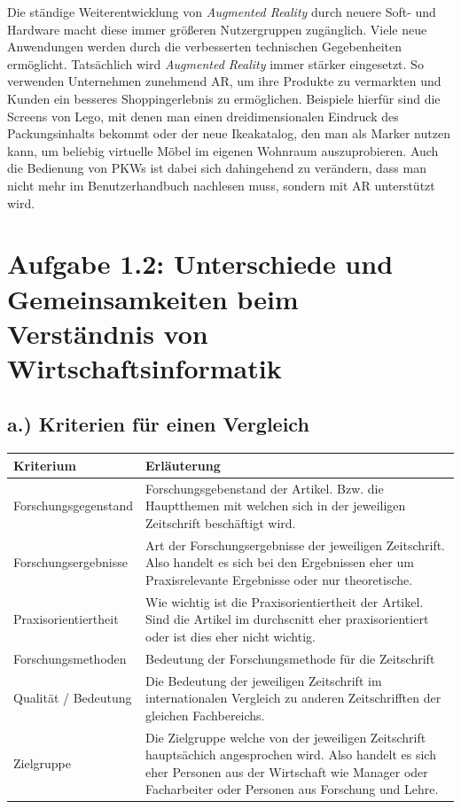 \documentclass[12pt,utf8]{scrartcl}
\begin{document}
\begin{flushleft}
Die ständige Weiterentwicklung von \textit{Augmented Reality} durch neuere Soft- und Hardware macht diese immer größeren Nutzergruppen zugänglich. Viele neue Anwendungen werden durch die verbesserten technischen Gegebenheiten ermöglicht. Tatsächlich wird \textit{Augmented Reality} immer stärker eingesetzt. So verwenden Unternehmen zunehmend AR, um ihre Produkte zu vermarkten und Kunden ein besseres Shoppingerlebnis zu ermöglichen. Beispiele hierfür sind die Screens von Lego, mit denen man einen dreidimensionalen Eindruck des Packungsinhalts bekommt oder der neue Ikeakatalog, den man als Marker nutzen kann, um beliebig virtuelle Möbel im eigenen Wohnraum auszuprobieren. Auch die Bedienung von PKWs ist dabei sich dahingehend zu verändern, dass man nicht mehr im Benutzerhandbuch nachlesen muss, sondern mit AR unterstützt wird.
\linebreak
\linebreak

\section*{\label{sec:einfuehrung}Aufgabe 1.2: Unterschiede und Gemeinsamkeiten beim Verständnis von Wirtschaftsinformatik}
\subsection*{\label{sub:einfuehrung}a.) Kriterien für einen Vergleich}

\begin{tabular}{|p{5cm}|p{10cm}|}
\hline
Kriterium & Erläuterung \\
\hline
Forschungsgegenstand & Forschungsgebenstand der Artikel. Bzw. die Hauptthemen mit welchen sich in der jeweiligen Zeitschrift beschäftigt wird.\\
\hline
Forschungsergebnisse & Art der Forschungsergebnisse der jeweiligen Zeitschrift. Also handelt es sich bei den Ergebnissen eher um Praxisrelevante Ergebnisse oder nur theoretische. \\
\hline
Praxisorientiertheit & Wie wichtig ist die Praxisorientiertheit der Artikel. Sind die Artikel im durchscnitt eher praxisorientiert oder ist dies eher nicht wichtig.\\
\hline
Forschungsmethoden & Bedeutung der Forschungsmethode für die Zeitschrift\\
\hline
Qualität / Bedeutung & Die Bedeutung der jeweiligen Zeitschrift im internationalen Vergleich zu anderen Zeitschrifften der gleichen Fachbereichs.\\
\hline
Zielgruppe & Die Zielgruppe welche von der jeweiligen Zeitschrift hauptsächich angesprochen wird. Also handelt es sich eher Personen aus der Wirtschaft wie Manager oder Facharbeiter oder Personen aus Forschung und Lehre.\\
\hline
\end{tabular}


\end{flushleft}
\end{document}

